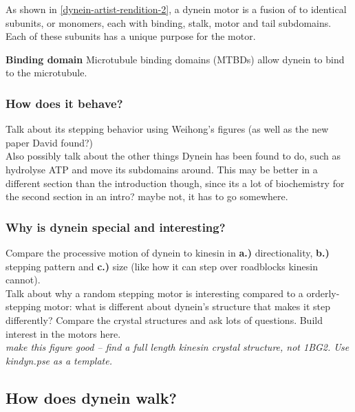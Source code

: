 \documentclass[10pt]{article} %
\begin{document}
As shown in \ref{dynein-artist-rendition-2}, a dynein motor is a fusion of to identical subunits, or monomers, each with binding, stalk, motor and tail subdomains. Each of these subunits has a unique purpose for the motor.

\textbf{Binding domain}
Microtubule binding domains (MTBDs) allow dynein to bind to the microtubule. 

\subsubsection{How does it behave?}
Talk about its stepping behavior using Weihong's figures (as well as the new paper David found?)\\

Also possibly talk about the other things Dynein has been found to do, such as hydrolyse ATP and
move its subdomains around. This may be better in a different section than the introduction though,
since its a lot of biochemistry for the second section in an intro? maybe not, it has to go somewhere.

\subsubsection{Why is dynein special and interesting?}
Compare the processive motion of dynein to kinesin in \textbf{a.)} directionality, \textbf{b.)}
stepping pattern and \textbf{c.)} size (like how it can step over roadblocks kinesin cannot).\\

Talk about why a random stepping motor is interesting compared to a orderly-stepping motor: what
is different about dynein's structure that makes it step differently? Compare the crystal structures
and ask lots of questions. Build interest in the motors here.\\


\textit{make this figure good -- find a full length kinesin crystal structure, not 1BG2. Use kindyn.pse as a template.}

\subsection{How does dynein walk?}
\end{document}
